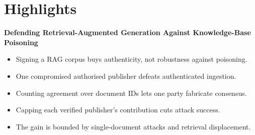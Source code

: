 \documentclass[11pt]{article}
\begin{document}
\section*{Highlights}

\noindent
\textbf{Defending Retrieval-Augmented Generation Against Knowledge-Base Poisoning}

\medskip

\begin{itemize}
  \item Signing a RAG corpus buys authenticity, not robustness against poisoning.

  \item One compromised authorised publisher defeats authenticated ingestion.

  \item Counting agreement over document IDs lets one party fabricate consensus.

  \item Capping each verified publisher's contribution cuts attack success.

  \item The gain is bounded by single-document attacks and retrieval displacement.
\end{itemize}
\end{document}
